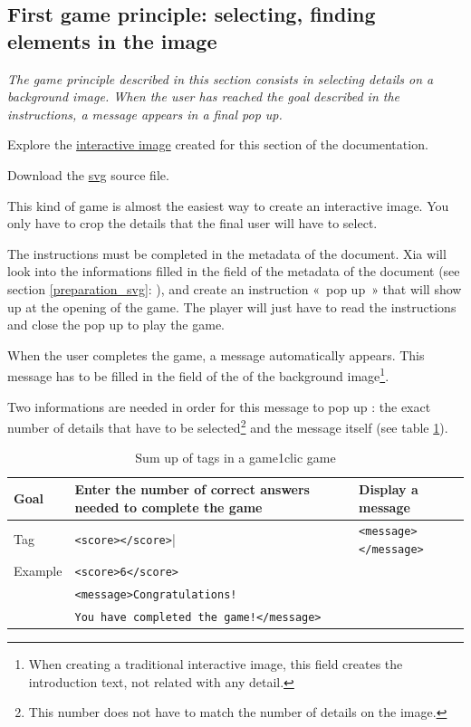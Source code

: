 \subsection{First game principle: selecting, finding elements in the image}\label{game1clicsection}

\textit{The game principle described in this section consists in selecting details 
on a background image. When the user has reached the goal described in the 
instructions, a message appears in a final pop up.}


\begin{links}
Explore the \href{http://xia.dane.ac-versailles.fr/demo/tuto/xia3}{interactive image}
created for this section of the documentation.

Download the \href{http://xia.dane.ac-versailles.fr/demo/tuto/xia3/svg/xia3.svg}{svg} source file.
\end{links}

This kind of game is almost the easiest way to create an interactive image.
You only have to crop the details that the final user will have to select. 

The instructions must be completed in the 
metadata of the document. Xia will look into 
the informations  filled in the  field of the metadata of the document
(see section \ref{preparation_svg}: ), 
and create an instruction «~pop up~» that will show up at the opening of the game. The player 
will just have to read the instructions and close the pop up to play the game.

When the user completes the game, a message automatically appears.
This message has to be filled in the  field of the  of the 
background image\footnote{When creating a traditional interactive image, 
this field creates the introduction text, not related with any detail.}. 

Two informations are needed in order for this message to pop up :
the exact number of details that have to be selected\footnote{This number does 
not have to match the number of details on the image.}
and the message itself (see table \ref{tag1_sumup}).

\begin{table}
 \begin{tabular}{|l|p{2in}|p{2in}|}
 \hline
  Goal & Enter the number of correct answers needed to complete the game & Display a message\\
  \hline
  Tag & \texttt{<score></score>}| & \texttt{<message></message>}\\
  \hline
  Example & \multicolumn{2}{|l|}{\texttt{<score>6</score>}}\\
   & \multicolumn{2}{|l|}{\texttt{<message>Congratulations!}}\\
    & \multicolumn{2}{|l|}{\texttt{You have completed the game!</message>}}\\
  \hline
 \end{tabular}
\caption{Sum up of tags in a game1clic game}
\label{tag1_sumup}
\end{table}
 
